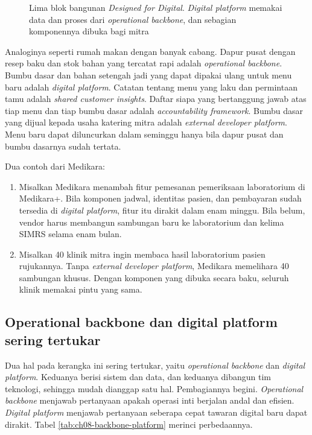 \begin{figure}[!htb]
  \centering
  
  \caption{Lima blok bangunan \textit{Designed for Digital}. \textit{Digital platform}
           memakai data dan proses dari \textit{operational backbone}, dan sebagian
           komponennya dibuka bagi mitra}
  \label{fig:ch08-lima-blok}
\end{figure}

Analoginya seperti rumah makan dengan banyak cabang. Dapur pusat dengan resep baku dan stok
bahan yang tercatat rapi adalah \textit{operational backbone}. Bumbu dasar dan bahan
setengah jadi yang dapat dipakai ulang untuk menu baru adalah \textit{digital platform}.
Catatan tentang menu yang laku dan permintaan tamu adalah \textit{shared customer insights}.
Daftar siapa yang bertanggung jawab atas tiap menu dan tiap bumbu dasar adalah
\textit{accountability framework}. Bumbu dasar yang dijual kepada usaha katering mitra
adalah \textit{external developer platform}. Menu baru dapat diluncurkan dalam seminggu
hanya bila dapur pusat dan bumbu dasarnya sudah tertata.

Dua contoh dari Medikara:

\begin{enumerate}
  \item Misalkan Medikara menambah fitur pemesanan pemeriksaan laboratorium di Medikara+.
        Bila komponen jadwal, identitas pasien, dan pembayaran sudah tersedia di
        \textit{digital platform}, fitur itu dirakit dalam enam minggu. Bila belum, vendor
        harus membangun sambungan baru ke laboratorium dan kelima SIMRS selama enam bulan.
  \item Misalkan 40 klinik mitra ingin membaca hasil laboratorium pasien rujukannya. Tanpa
        \textit{external developer platform}, Medikara memelihara 40 sambungan khusus.
        Dengan komponen yang dibuka secara baku, seluruh klinik memakai pintu yang sama.
\end{enumerate}

\subsection*{Operational backbone dan digital platform sering tertukar}

Dua hal pada kerangka ini sering tertukar, yaitu \textit{operational backbone} dan
\textit{digital platform}. Keduanya berisi sistem dan data, dan keduanya dibangun tim
teknologi, sehingga mudah dianggap satu hal. Pembagiannya begini. \textit{Operational
backbone} menjawab pertanyaan apakah operasi inti berjalan andal dan efisien.
\textit{Digital platform} menjawab pertanyaan seberapa cepat tawaran digital baru dapat
dirakit. Tabel \ref{tab:ch08-backbone-platform} merinci perbedaannya.


